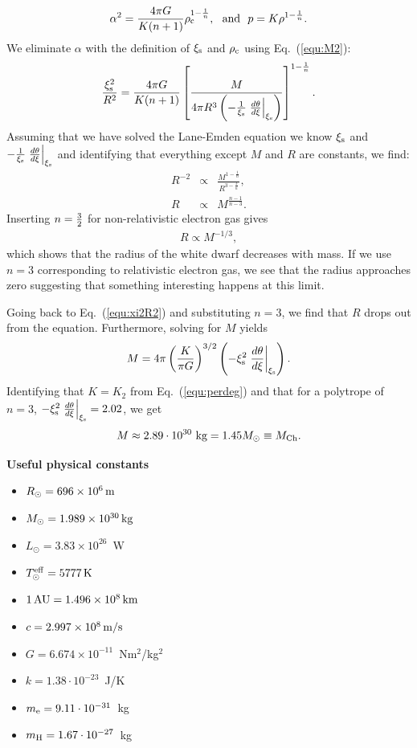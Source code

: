\documentclass[12pt]{article}
\def\rhoc{\textcolor{red}{\rho}}
\def\xis{\xi_{\rm s}}
\def\rhoc{\rho_{\rm c}}
\def\threehalfs{{\textstyle{3\over2}}}
\begin{document}
\begin{equation}
\alpha^2 = \frac{4\pi G}{K(n+1)} \rhoc^{1-\frac{1}{n}}, \ \ \mbox{and}\ \ p = K\rho^{1-\frac{1}{n}}.
\end{equation}
We eliminate $\alpha$ with the definition of $\xis$ and $\rhoc$ using
Eq.~(\ref{equ:M2}):
\begin{equation}
\frac{\xis^2}{R^2} = \frac{4\pi G}{K(n+1)} \left[ \frac{M}{4\pi R^3 \left(-\frac{1}{\xis} \left.\frac{d\theta}{d\xi}\right|_{\xis} \right)}  \right]^{1-\frac{1}{n}}.\label{equ:xi2R2}
\end{equation}
Assuming that we have solved the Lane-Emden equation we know $\xis$
and $-\frac{1}{\xis} \left.\frac{d\theta}{d\xi}\right|_{\xis}$ and
identifying that everything except $M$ and $R$ are constants, we find:
\begin{eqnarray}
R^{-2} &\propto& \frac{M^{1-\frac{1}{n}}}{R^{3-\frac{3}{n}}}, \nonumber \\
R      &\propto& M^{\frac{n-1}{n-3}}.
\end{eqnarray}
Inserting $n=\threehalfs$ for non-relativistic electron gas gives
\begin{eqnarray}
R \propto M^{-1/3},
\end{eqnarray}
which shows that the radius of the white dwarf decreases with mass.
If we use $n=3$ corresponding to relativistic electron gas, we see
that the radius approaches zero suggesting that something interesting
happens at this limit.

Going back to Eq.~(\ref{equ:xi2R2}) and substituting $n=3$, we find
that $R$ drops out from the equation. Furthermore, solving for $M$
yields
\begin{equation}
M = 4\pi \left(\frac{K}{\pi G}\right)^{3/2} \left( - \xis^2 \left.\frac{d\theta}{d\xi}\right|_{\xis} \right).
\end{equation}
Identifying that $K=K_2$ from Eq.~(\ref{equ:perdeg}) and that for a
polytrope of $n=3$, $-\xis^2 \left.\frac{d\theta}{d\xi}\right|_{\xis}
= 2.02$, we get
\begin{equation}
M \approx 2.89\cdot 10^{30}~\mbox{kg} = 1.45M_\odot \equiv M_{\rm Ch}.
\end{equation}



{\bf Useful physical constants}
\begin{itemize}
  \item $R_{\odot} = 696 \times 10^6\,{\rm m}$
  \item $M_{\odot} = 1.989 \times 10^{30}\,{\rm kg}$
  \item $L_{\odot} = 3.83 \times 10^{26}$~W
  \item $T^{\rm eff}_{\odot} = 5777\,{\rm K}$
  \item $1\,{\rm AU} = 1.496 \times 10^8\,{\rm km}$
  \item $c = 2.997 \times 10^8\,{\rm m/s}$
  \item $G = 6.674 \times 10^{-11}$~Nm$^2$/kg$^2$
  \item $k = 1.38\cdot10^{-23}$~J/K
  \item $m_{\rm e} = 9.11\cdot10^{-31}$~kg
  \item $m_{\rm H} = 1.67\cdot10^{-27}$~kg
\end{itemize}
\end{document}
